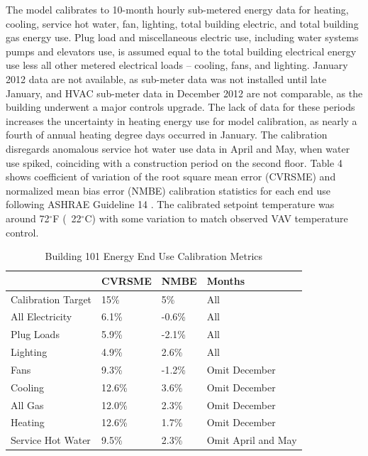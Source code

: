 \documentclass[review]{elsarticle}
\begin{document}
The model calibrates to 10-month hourly sub-metered energy data for heating, cooling, service hot water, fan, lighting, total building electric, and total building gas energy use. Plug load and miscellaneous electric use, including water systems pumps and elevators use, is assumed equal to the total building electrical energy use less all other metered electrical loads – cooling, fans, and lighting. January 2012 data are not available, as sub-meter data was not installed until late January, and HVAC sub-meter data in December 2012 are not comparable, as the building underwent a major controls upgrade. The lack of data for these periods increases the uncertainty in heating energy use for model calibration, as nearly a fourth of annual heating degree days occurred in January. The calibration disregards anomalous service hot water use data in April and May, when water use spiked, coinciding with a construction period on the second floor. Table 4 shows coefficient of variation of the root square mean error (CVRSME) and normalized mean bias error (NMBE) calibration statistics for each end use following ASHRAE Guideline 14 \cite{ASHRAE14}. The calibrated setpoint temperature was around 72$^{\circ}$F (~22$^{\circ}$C)  with some variation to match observed VAV temperature control.

\begin{table}[h]
	\centering
	\begin{tabular}{l l l l}
		\hline
		& \textbf{CVRSME} & \textbf{NMBE} & \textbf{Months}\\
		\hline
		Calibration Target & 15\% & 5\% & All \\
		All Electricity & 6.1\% & -0.6\% & All \\
		Plug Loads & 5.9\% & -2.1\% & All \\
		Lighting & 4.9\% & 2.6\% & All \\
		Fans & 9.3\% & -1.2\% & Omit December \\
		Cooling & 12.6\% & 3.6\% & Omit December \\
		All Gas & 12.0\% & 2.3\% & Omit December \\
		Heating & 12.6\% & 1.7\% & Omit December \\
		Service Hot Water & 9.5\% & 2.3\% & Omit April and May \\
		\hline
	\end{tabular}
	\caption{Building 101 Energy End Use Calibration Metrics}
\end{table}
\end{document}
